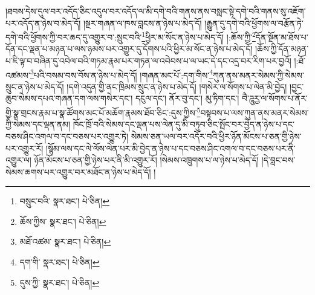 །ཐབས་དེས་དུལ་བར་འདོད་ཅིང་འདུལ་བར་འདོད་ལ་མི་དགེ་བའི་གནས་ནས་བསླང་སྟེ་དགེ་བའི་གནས་སུ་འཇོག་པར་འདོད་ན་ཉེས་བ་མེད་དོ། །སྔར་གཞན་ལ་ཁས་བླངས་ན་ཉེས་པ་མེད་དོ། །རྒྱུན་དུ་དགེ་བའི་ཕྱོགས་ལ་བརྩོན་ཏེ་དགེ་བའི་ཕྱོགས་ཀྱི་བར་ཆད་དུ་འགྱུར་བ་:སྲུང་བའི་\footnote{བསྲུང་བའི་  སྣར་ཐང་།  པེ་ཅིན། }ཕྱིར་མ་སོང་ན་ཉེས་པ་མེད་དོ། །:ཆོས་ཀྱི་\footnote{ཆོས་ཀྱིས་  སྣར་ཐང་།  པེ་ཅིན། }དོན་སྔོན་མ་ཐོས་པ་དོན་དང་ལྡན་པ་མཉན་པ་ལས་ཉམས་པར་འགྱུར་དུ་དོགས་པའི་ཕྱིར་མ་སོང་ན་ཉེས་པ་མེད་དོ། །ཆོས་ཀྱི་དོན་མཉན་པ་ཇི་ལྟ་བ་བཞིན་དུ་འབེལ་བའི་གཏམ་རྣམ་པར་གཏན་ལ་འབེབས་པ་ལ་ཡང་དེ་དང་འདྲ་བར་རིག་པར་བྱའོ། །:ཐོ་འཚམས་\footnote{མཐོ་འཚམ་  སྣར་ཐང་།  པེ་ཅིན། }པའི་བསམ་བས་བོས་ན་ཉེས་པ་མེད་དོ། །གཞན་མང་པོ་:དག་གིས་\footnote{དག་གི་  སྣར་ཐང་།  པེ་ཅིན། }ཀུན་ནས་མནར་སེམས་ཀྱི་སེམས་སྲུང་ན་ཉེས་པ་མེད་དོ། །དགེ་འདུན་གྱི་ནང་ཁྲིམས་སྲུང་ན་ཉེས་པ་མེད་དོ། །གསེར་ལ་སོགས་པ་ལེན་མི་བྱེད། །བྱང་ཆུབ་སེམས་དཔའ་གཞན་དག་ལས་གསེར་དང་། དངུལ་དང་། ནོར་བུ་དང་། མུ་ཏིག་དང་། བཻ་ཌཱུརྱ་ལ་སོགས་པ་ནོར་གྱི་སྣ་གྲངས་རྣམ་པ་སྣ་ཚོགས་མང་པོ་མཆོག་རྣམས་ཐོབ་ཅིང་:དུས་ཀྱིས་\footnote{དུས་ཀྱི་  སྣར་ཐང་།  པེ་ཅིན། }བསྟབས་པ་ལས་ཀུན་ནས་མནར་སེམས་ཀྱི་སེམས་དང་ལྡན་ནམ། ཁོང་ཁྲོ་བའི་སེམས་དང་ལྡན་པས་ལེན་དུ་མི་བཏུབ་ཅིང་སྤོང་བར་བྱེད་ན་ཉེས་པ་དང་བཅས་ཤིང་འགལ་བ་དང་བཅས་པར་འགྱུར་ཏེ། སེམས་ཅན་ཡལ་བར་འདོར་བའི་ཕྱིར་ཉོན་མོངས་པ་ཅན་གྱི་ཉེས་པར་འགྱུར་རོ། །སྙོམ་ལས་དང་ལེ་ལོས་ལེན་པར་མི་བྱེད་ན་ཉེས་པ་དང་བཅས་ཤིང་འགལ་བ་དང་བཅས་པར་ནི་འགྱུར་ལ། ཉོན་མོངས་པ་ཅན་གྱི་ཉེས་པར་ནི་མི་འགྱུར་རོ། །སེམས་འཁྲུགས་པ་ལ་ཉེས་པ་མེད་དོ། །དེ་བླང་བས་སེམས་ཆགས་པར་འགྱུར་བར་མཐོང་ན་ཉེས་པ་མེད་དོ། །
